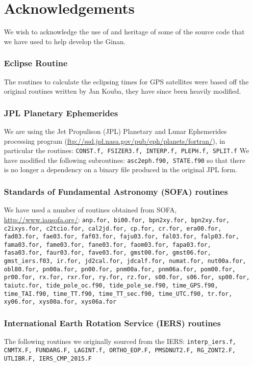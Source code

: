 \chapter{Acknowledgements}
\label{ch:Acknowledgements}
\sloppy

We wish to acknowledge the use of and heritage of some of the source code that we have used to help develop the Ginan.

\subsection{Eclipse Routine}
\noindent The routines to calculate the eclipsing times for GPS satellites were based off the original routines written by Jan Kouba, they have since been heavily modified.

\subsection{JPL Planetary Ephemerides}
\noindent We are using the Jet Propulison (JPL) Planetary and Lunar Ephemerides processing program (\url{ftp://ssd.jpl.nasa.gov/pub/eph/planets/fortran/}), in particular the routines:
\texttt{CONST.f, FSIZER3.f, INTERP.f, PLEPH.f, SPLIT.f}
We have modified the following subroutines:
\texttt{asc2eph.f90, STATE.f90}
so that there is no longer a dependency on a binary file produced in the original JPL form.

\subsection{Standards of Fundamental Astronomy (SOFA) routines}
\noindent We have used a number of routines obtained from SOFA, \url{http://www.iausofa.org/}:
\texttt{anp.for, bi00.for, bpn2xy.for, bpn2xy.for, c2ixys.for, c2tcio.for, cal2jd.for, cp.for, cr.for, era00.for, fad03.for, fae03.for, faf03.for, faju03.for, fal03.for, falp03.for, fama03.for, fame03.for, fane03.for, faom03.for, fapa03.for, fasa03.for, faur03.for, fave03.for, gmst00.for, gmst06.for, gmst\_iers.f03, ir.for, jd2cal.for, jdcalf.for, numat.for, nut00a.for, obl80.for, pn00a.for, pn00.for, pnm00a.for, pnm06a.for, pom00.for, pr00.for, rx.for, rxr.for, ry.for, rz.for, s00.for, s06.for, sp00.for, taiutc.for, tide\_pole\_oc.f90, tide\_pole\_se.f90, time\_GPS.f90, time\_TAI.f90, time\_TT.f90, time\_TT\_sec.f90, time\_UTC.f90, tr.for, xy06.for, xys00a.for, xys06a.for
}


\subsection{International Earth Rotation Service (IERS) routines}
\noindent The following routines we originally sourced from the IERS:
\texttt{interp\_iers.f, CNMTX.F, FUNDARG.F, LAGINT.f, ORTHO\_EOP.F, PMSDNUT2.F, RG\_ZONT2.F, UTLIBR.F, IERS\_CMP\_2015.F}